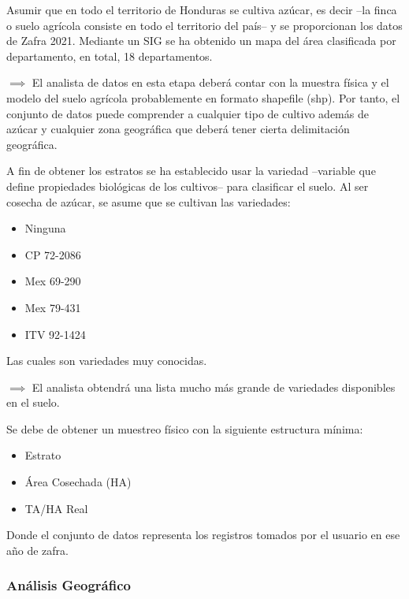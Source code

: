 Asumir que en todo el territorio de Honduras se cultiva azúcar, es decir --la finca o suelo agrícola consiste en todo el territorio del país-- y se proporcionan los datos de Zafra 2021. Mediante un SIG se ha obtenido un mapa del área clasificada por departamento, en total, 18 departamentos.

\bigbreak

$\implies$ El analista de datos en esta etapa deberá contar con la muestra física y el modelo del suelo agrícola probablemente en formato shapefile (shp). Por tanto, el conjunto de datos puede comprender a cualquier tipo de  cultivo además de azúcar y cualquier zona geográfica que deberá tener
cierta delimitación geográfica.

\bigbreak

A fin de obtener los estratos se ha establecido usar la variedad --variable que define propiedades biológicas de los cultivos-- para clasificar el suelo. Al ser cosecha de azúcar, se asume que se cultivan las variedades:

\begin{itemize}
    \item Ninguna
    \item CP 72-2086
    \item Mex 69-290
    \item Mex 79-431
    \item ITV 92-1424
\end{itemize}

Las cuales son variedades muy conocidas.

\bigbreak

$\implies$ El analista obtendrá una lista mucho más grande de variedades disponibles en el suelo.

\bigbreak

Se debe de obtener un muestreo físico con la siguiente estructura mínima:

\begin{itemize}
    \item Estrato
    \item Área Cosechada (HA)
    \item TA/HA Real
\end{itemize}

Donde el conjunto de datos representa los registros tomados por el usuario en ese año de zafra.

\subsubsection{Análisis Geográfico}

